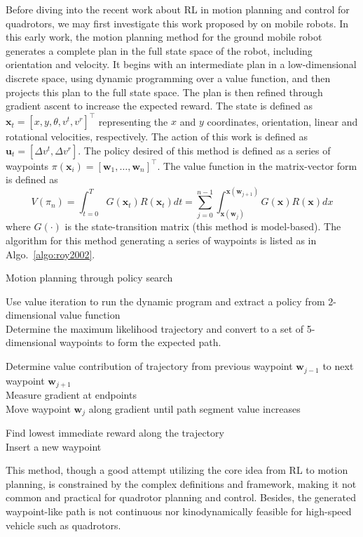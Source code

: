 \documentclass{article}
\newcommand{\B}[1]{\mathbf{#1}}
\begin{document}
Before diving into the recent work about RL in motion planning and 
control for quadrotors, we may first investigate this work proposed by 
\textcite{roy2002motion} on mobile robots.
In this early work, the motion planning method for the ground mobile robot 
generates a complete plan in the full state space of the robot, including orientation and velocity. 
It begins with an intermediate plan in a low-dimensional discrete space, using dynamic programming over a value function, and then projects this plan to the full state space. The plan is then refined through gradient ascent to increase the expected reward.
The state is defined as $\B{x}_t = \left[ x, y, \theta, v^t, v^r\right]^\top$ representing the $x$ and $y$ coordinates, orientation, linear 
and rotational velocities, respectively.
The action of this work is defined as $\B{u}_t = \left[ \Delta v^t, \Delta v^r \right]$.
The policy desired of this method is defined as a series 
of waypoints $\pi(\B{x}_i) = \left[ \B{w}_1, \dots, \B{w}_n\right]^\top$.
The value function in the matrix-vector form is defined as 
\[
  V(\pi_n) = \int_{t=0}^{T} G(\B{x}_t) R(\B{x}_t) dt 
           = \sum_{j=0}^{n-1} \int_{\B{x}(\B{w}_j)}^{\B{x}(\B{w}_{j+1})} G(\B{x}) R(\B{x}) dx 
\]
where $G(\cdot)$ is the state-transition matrix (this method
is model-based).
The algorithm for this method generating a series of waypoints is listed as in Algo.~\ref{algo:roy2002}.
\begin{algorithm}
  \caption{Motion planning through policy search}
  \label{algo:roy2002}

  Use value iteration to run the dynamic program and extract a policy from 2-dimensional value function \\

  Determine the maximum likelihood trajectory and convert to a set of 5-dimensional waypoints to form the expected path. \\

  {
    \ForEach{Waypoint $\B{w}_j$}
    {
      Determine value contribution of trajectory from previous waypoint $\B{w}_{j-1}$ to next waypoint $\B{w}_{j+1}$ \\
      Measure gradient at endpoints \\
      Move waypoint $\B{w}_j$ along gradient until path segment value increases \\
    }

    Find lowest immediate reward along the trajectory \\
    Insert a new waypoint
  }
\end{algorithm}
This method, though a good attempt utilizing the core idea from RL to motion planning, 
is constrained by the complex definitions and framework, making
it not common and practical for quadrotor planning and control.
Besides, the generated waypoint-like path is not continuous nor 
kinodynamically feasible for high-speed vehicle such as quadrotors.
\end{document}
